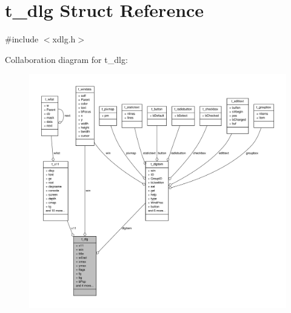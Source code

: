\hypertarget{structt__dlg}{\section{t\-\_\-dlg \-Struct \-Reference}
\label{structt__dlg}
}


{\ttfamily \#include $<$xdlg.\-h$>$}



\-Collaboration diagram for t\-\_\-dlg\-:
\nopagebreak
\begin{figure}[H]
\begin{center}
\leavevmode
\includegraphics[width=350pt]{structt__dlg__coll__graph}
\end{center}
\end{figure}
